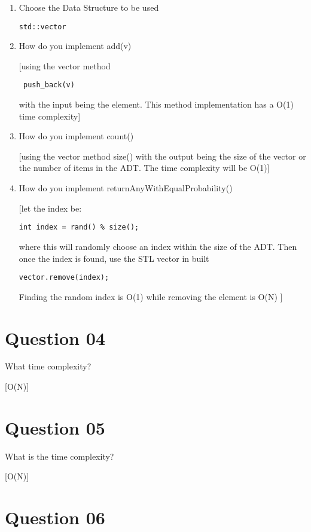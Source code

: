 \documentclass{article}
\begin{document}
\begin{enumerate}[label=(\arabic*)]
\item Choose the Data Structure to be used

\begin{verbatim}
std::vector
\end{verbatim}

\item How do you implement add(v)

[using the vector method \begin{verbatim} push_back(v)\end{verbatim} with the input being the element. This method
implementation has a O(1) time complexity]

\item How do you implement count()

[using the vector method size() with the output being the size of the vector or the number of items in the ADT. The time
complexity will be O(1)]

\item How do you implement returnAnyWithEqualProbability()

[let the index be: \begin{verbatim}
int index = rand() % size();
\end{verbatim}
where this will randomly choose an index within the size of the ADT. Then once the index is found, use the STL vector in built \begin{verbatim} 
vector.remove(index);
\end{verbatim}
Finding the random index is O(1) while removing the element is O(N)
]

\end{enumerate}

\section{Question 04}

\item What time complexity?

[O(N)]

\section{Question 05}

\item What is the time complexity?

[O(N)]

\section{Question 06}
\end{document}

